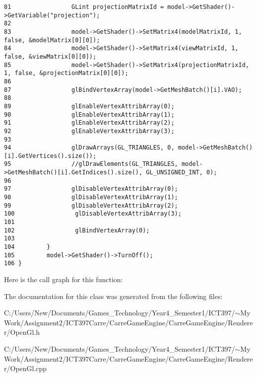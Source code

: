 \begin{Code}
\begin{verbatim}
81                 GLint projectionMatrixId = model->GetShader()->GetVariable("projection");
82 
83                 model->GetShader()->SetMatrix4(modelMatrixId, 1, false, &modelMatrix[0][0]);
84                 model->GetShader()->SetMatrix4(viewMatrixId, 1, false, &viewMatrix[0][0]);
85                 model->GetShader()->SetMatrix4(projectionMatrixId, 1, false, &projectionMatrix[0][0]);
86 
87                 glBindVertexArray(model->GetMeshBatch()[i].VAO);
88 
89                 glEnableVertexAttribArray(0);
90                 glEnableVertexAttribArray(1);
91                 glEnableVertexAttribArray(2);
92                 glEnableVertexAttribArray(3);
93 
94                 glDrawArrays(GL_TRIANGLES, 0, model->GetMeshBatch()[i].GetVertices().size());
95                 //glDrawElements(GL_TRIANGLES, model->GetMeshBatch()[i].GetIndices().size(), GL_UNSIGNED_INT, 0);
96 
97                 glDisableVertexAttribArray(0);
98                 glDisableVertexAttribArray(1);
99                 glDisableVertexAttribArray(2);
100                 glDisableVertexAttribArray(3);
101 
102                 glBindVertexArray(0);
103 
104         }
105         model->GetShader()->TurnOff();
106 }
\end{verbatim}
\end{Code}




Here is the call graph for this function:

The documentation for this class was generated from the following files:\begin{CompactItemize}
\item 
C:/Users/New/Documents/Games\_\-Technology/Year4\_\-Semester1/ICT397/$\sim$My Work/Assignment2/ICT397Carre/CarreGameEngine/CarreGameEngine/Renderer/OpenGl.h\item 
C:/Users/New/Documents/Games\_\-Technology/Year4\_\-Semester1/ICT397/$\sim$My Work/Assignment2/ICT397Carre/CarreGameEngine/CarreGameEngine/Renderer/OpenGl.cpp\end{CompactItemize}
